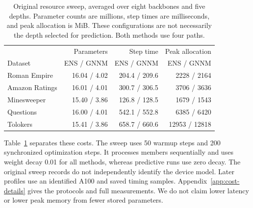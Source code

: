 \begin{table}[t]
\centering\small
\setlength{\tabcolsep}{4pt}
\caption{Original resource sweep, averaged over eight backbones and five depths. Parameter counts are millions, step times are milliseconds, and peak allocation is MiB. These configurations are not necessarily the depth selected for prediction. Both methods use four paths.}
\label{tab:resource-main}
\begin{tabular}{lrrr}
\toprule
& Parameters & Step time & Peak allocation\\
Dataset & ENS / GNNM & ENS / GNNM & ENS / GNNM\\
\midrule
Roman Empire & 16.04 / 4.02 & 204.4 / 209.6 & 2228 / 2164\\
Amazon Ratings & 16.01 / 4.01 & 300.7 / 306.5 & 3706 / 3636\\
Minesweeper & 15.40 / 3.86 & 126.8 / 128.5 & 1679 / 1543\\
Questions & 16.00 / 4.01 & 542.1 / 552.8 & 6385 / 6420\\
Tolokers & 15.41 / 3.86 & 658.7 / 660.6 & 12953 / 12818\\
\bottomrule
\end{tabular}
\end{table}

Table~\ref{tab:resource-main} separates these costs. The sweep uses 50 warmup steps and 200 synchronized optimization steps. It processes members sequentially and uses weight decay 0.01 for all methods, whereas predictive runs use zero decay. The original sweep records do not independently identify the device model. Later profiles use an identified A100 and saved timing samples. Appendix~\ref{app:cost-details} gives the protocols and full measurements. We do not claim lower latency or lower peak memory from fewer stored parameters.

